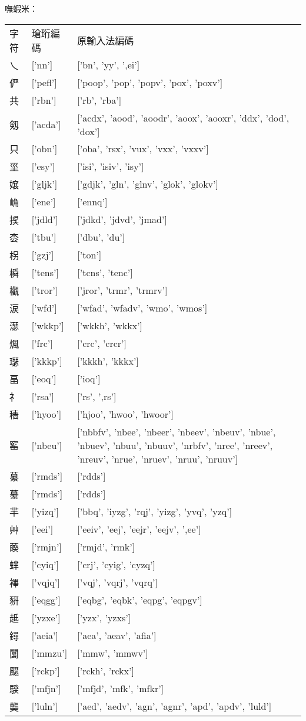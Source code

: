 嘸蝦米：\\
\begin{tabular}[t]{lll}
字符 & 瑲珩編碼 & 原輸入法編碼\\
乀 & ['nn'] & ['bn', 'yy', ',ei']\\
俨 & ['pefl'] & ['poop', 'pop', 'popv', 'pox', 'poxv']\\
共 & ['rbn'] & ['rb', 'rba']\\
剱 & ['acda'] & ['acdx', 'aood', 'aoodr', 'aoox', 'aooxr', 'ddx', 'dod', 'dox']\\
只 & ['obn'] & ['oba', 'rsx', 'vux', 'vxx', 'vxxv']\\
坙 & ['esy'] & ['isi', 'isiv', 'isy']\\
嬢 & ['gljk'] & ['gdjk', 'gln', 'glnv', 'glok', 'glokv']\\
崅 & ['ene'] & ['ennq']\\
捑 & ['jdld'] & ['jdkd', 'jdvd', 'jmad']\\
枩 & ['tbu'] & ['dbu', 'du']\\
柺 & ['gzj'] & ['ton']\\
橓 & ['tens'] & ['tcns', 'tenc']\\
欟 & ['tror'] & ['jror', 'trmr', 'trmrv']\\
涙 & ['wfd'] & ['wfad', 'wfadv', 'wmo', 'wmos']\\
濏 & ['wkkp'] & ['wkkh', 'wkkx']\\
煈 & ['frc'] & ['crc', 'crcr']\\
璱 & ['kkkp'] & ['kkkh', 'kkkx']\\
畐 & ['eoq'] & ['ioq']\\
礻 & ['rsa'] & ['rs', ',rs']\\
穯 & ['hyoo'] & ['hjoo', 'hwoo', 'hwoor']\\
窰 & ['nbeu'] & ['nbbfv', 'nbee', 'nbeer', 'nbeev', 'nbeuv', 'nbue', 'nbuev', 'nbuu', 'nbuuv', 'nrbfv', 'nree', 'nreev', 'nreuv', 'nrue', 'nruev', 'nruu', 'nruuv']\\
繤 & ['rmds'] & ['rdds']\\
繤 & ['rmds'] & ['rdds']\\
羋 & ['yizq'] & ['bbq', 'iyzg', 'rqj', 'yizg', 'yvq', 'yzq']\\
艸 & ['eei'] & ['eeiv', 'eej', 'eejr', 'eejv', ',ee']\\
藈 & ['rmjn'] & ['rmjd', 'rmk']\\
蝆 & ['cyiq'] & ['crj', 'cyig', 'cyzq']\\
襅 & ['vqjq'] & ['vqj', 'vqrj', 'vqrq']\\
豣 & ['eqgg'] & ['eqbg', 'eqbk', 'eqpg', 'eqpgv']\\
趆 & ['yzxe'] & ['yzx', 'yzxs']\\
鐞 & ['aeia'] & ['aea', 'aeav', 'afia']\\
闅 & ['mmzu'] & ['mmw', 'mmwv']\\
飋 & ['rckp'] & ['rckh', 'rckx']\\
騤 & ['mfjn'] & ['mfjd', 'mfk', 'mfkr']\\
龑 & ['luln'] & ['aed', 'aedv', 'agn', 'agnr', 'apd', 'apdv', 'luld']\\
\end{tabular}


